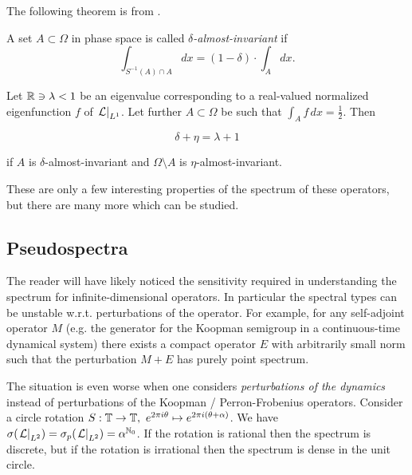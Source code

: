 The following theorem is from \cite{attr}. 

\begin{definition}
    A set $A \subset \Omega$ in phase space is called \emph{$\delta$-almost-invariant} if 
    \begin{equation}
        \int_{ S^{-1} (A) \cap A } dx = (1 - \delta) \cdot \int_A dx . 
    \end{equation}
\end{definition}

\begin{theorem}
    Let $\mathbb{R} \ni \lambda < 1$ be an eigenvalue corresponding to a real-valued 
    normalized eigenfunction $f$ of $\left. \mathcal{L} \right|_{L^1}$. Let further 
    $A \subset \Omega$ be such that $\int_A f\, dx = \frac{1}{2}$. Then 

    \begin{equation}
        \delta + \eta = \lambda + 1
    \end{equation}

    if $A$ is $\delta$-almost-invariant and $\Omega \setminus A$ is 
    $\eta$-almost-invariant. 
\end{theorem}

These are only a few interesting properties of the spectrum of these operators, but there 
are many more which can be studied. 


\subsection{Pseudospectra}

The reader will have likely noticed the sensitivity required in understanding the spectrum 
for infinite-dimensional operators. In particular the spectral types can be unstable 
w.r.t. perturbations of the operator. For example, for any self-adjoint operator $M$ (e.g. 
the generator for the Koopman semigroup in a continuous-time dynamical system) there 
exists a compact operator $E$ with arbitrarily small norm such that the perturbation 
$M + E$ has purely point spectrum. 

The situation is even worse when one considers \emph{perturbations of the dynamics} 
instead of perturbations of the Koopman / Perron-Frobenius operators. Consider a circle 
rotation $S : \mathbb{T} \to \mathbb{T},\ e^{2\pi i \theta} \mapsto e^{2\pi i (\theta + \alpha)}$. 
We have 
$\sigma ( \left. \mathcal{L} \right|_{L^2} ) = \sigma_p ( \left. \mathcal{L} \right|_{L^2} ) = \alpha^{\mathbb{N}_0}$. 
If the rotation is rational then the spectrum is discrete, but if the rotation is 
irrational then the spectrum is dense in the unit circle. 

